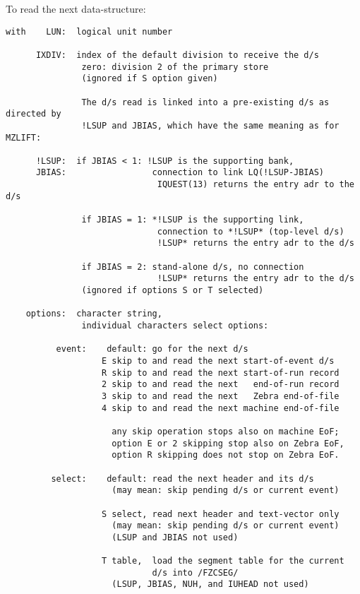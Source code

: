 {To read the next data-structure:

\begin{verbatim}
with    LUN:  logical unit number

      IXDIV:  index of the default division to receive the d/s
               zero: division 2 of the primary store
               (ignored if S option given)

               The d/s read is linked into a pre-existing d/s as directed by
               !LSUP and JBIAS, which have the same meaning as for MZLIFT:

      !LSUP:  if JBIAS < 1: !LSUP is the supporting bank,
      JBIAS:                 connection to link LQ(!LSUP-JBIAS)
                              IQUEST(13) returns the entry adr to the d/s

               if JBIAS = 1: *!LSUP is the supporting link,
                              connection to *!LSUP* (top-level d/s)
                              !LSUP* returns the entry adr to the d/s

               if JBIAS = 2: stand-alone d/s, no connection
                              !LSUP* returns the entry adr to the d/s
               (ignored if options S or T selected)

    options:  character string,
               individual characters select options:

          event:    default: go for the next d/s
                   E skip to and read the next start-of-event d/s
                   R skip to and read the next start-of-run record
                   2 skip to and read the next   end-of-run record
                   3 skip to and read the next   Zebra end-of-file
                   4 skip to and read the next machine end-of-file

                     any skip operation stops also on machine EoF;
                     option E or 2 skipping stop also on Zebra EoF,
                     option R skipping does not stop on Zebra EoF.

         select:    default: read the next header and its d/s
                     (may mean: skip pending d/s or current event)

                   S select, read next header and text-vector only
                     (may mean: skip pending d/s or current event)
                     (LSUP and JBIAS not used)

                   T table,  load the segment table for the current
                             d/s into /FZCSEG/
                     (LSUP, JBIAS, NUH, and IUHEAD not used)


\end{verbatim}}
